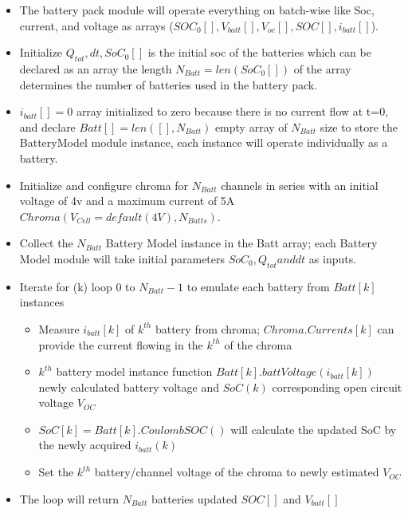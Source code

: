 \begin{itemize}
    \item The battery pack module will operate everything on batch-wise like Soc, current, and voltage as arrays ($SOC_0[] ,V_{batt}[],V_{oc}[],SOC[],i_{batt}[]$).
    \item Initialize $Q_{tot},dt , SoC_0[]$ is the initial soc of the batteries which can be declared as an array the length $N_{Batt} = len(SoC_0[])$ of the array determines the number of batteries used in the battery pack.
    \item $i_{batt}[] = 0$ array initialized to zero because there is no current flow at t=0, and declare  $Batt[] = len([],N_{Batt})$ empty array of $N_{Batt}$ size to store the BatteryModel module instance, each instance will operate individually as a battery.
    \item Initialize and configure chroma for $N_{Batt}$ channels in series with an initial voltage of 4v and a maximum current of 5A  $Chroma(V_{Cell}=default (4V),N_{Batts} )$.
    \item Collect the $N_{Batt}$ Battery Model instance in the Batt array;  each  Battery Model module will take initial parameters $SoC_0, Q_{tot} and dt$ as inputs.
    \item Iterate for (k) loop 0 to $N_{Batt} -1$ to emulate each battery from $Batt[k]$ instances
        \begin{itemize}
            \item Measure $i_{batt}[k]$ of $k^{th}$ battery from chroma; $Chroma.Currents[k]$ can provide the current flowing in the $k^{th}$ of the chroma
            \item $k^{th}$ battery model instance function $Batt[k].battVoltage(i_{batt}[k])$ newly calculated battery voltage and $SoC(k)$ corresponding open circuit voltage $V_{OC}$
            \item $SoC[k] = Batt[k].CoulombSOC()$ will calculate the updated SoC by the newly acquired $i_{batt}(k)$
            \item Set the $k^{th}$ battery/channel voltage of the chroma to newly estimated $V_{OC}$
        \end{itemize}
    \item The loop will return  $N_{Batt}$ batteries updated $SOC[]$ and $V_{batt}[]$
\end{itemize}

